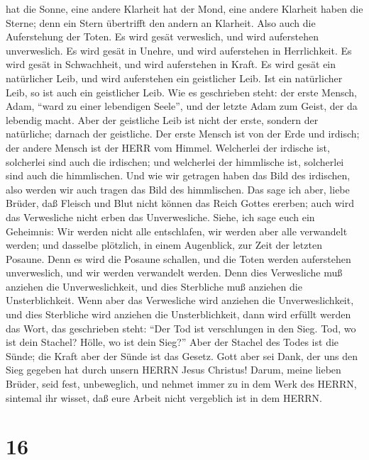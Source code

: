 hat die Sonne, eine andere Klarheit hat der Mond, eine andere Klarheit
haben die Sterne; denn ein Stern übertrifft den andern an Klarheit.
 Also auch die Auferstehung der Toten. Es wird gesät
verweslich, und wird auferstehen unverweslich.  Es wird
gesät in Unehre, und wird auferstehen in Herrlichkeit. Es wird gesät in
Schwachheit, und wird auferstehen in Kraft.  Es wird gesät
ein natürlicher Leib, und wird auferstehen ein geistlicher Leib. Ist ein
natürlicher Leib, so ist auch ein geistlicher Leib.  Wie es
geschrieben steht: der erste Mensch, Adam, ``ward zu einer lebendigen
Seele'', und der letzte Adam zum Geist, der da lebendig macht.
 Aber der geistliche Leib ist nicht der erste, sondern der
natürliche; darnach der geistliche.  Der erste Mensch ist
von der Erde und irdisch; der andere Mensch ist der HERR vom Himmel.
 Welcherlei der irdische ist, solcherlei sind auch die
irdischen; und welcherlei der himmlische ist, solcherlei sind auch die
himmlischen.  Und wie wir getragen haben das Bild des
irdischen, also werden wir auch tragen das Bild des himmlischen.
 Das sage ich aber, liebe Brüder, daß Fleisch und Blut
nicht können das Reich Gottes ererben; auch wird das Verwesliche nicht
erben das Unverwesliche.  Siehe, ich sage euch ein
Geheimnis: Wir werden nicht alle entschlafen, wir werden aber alle
verwandelt werden;  und dasselbe plötzlich, in einem
Augenblick, zur Zeit der letzten Posaune. Denn es wird die Posaune
schallen, und die Toten werden auferstehen unverweslich, und wir werden
verwandelt werden.  Denn dies Verwesliche muß anziehen die
Unverweslichkeit, und dies Sterbliche muß anziehen die Unsterblichkeit.
 Wenn aber das Verwesliche wird anziehen die
Unverweslichkeit, und dies Sterbliche wird anziehen die Unsterblichkeit,
dann wird erfüllt werden das Wort, das geschrieben steht: 
``Der Tod ist verschlungen in den Sieg. Tod, wo ist dein Stachel? Hölle,
wo ist dein Sieg?''  Aber der Stachel des Todes ist die
Sünde; die Kraft aber der Sünde ist das Gesetz.  Gott aber
sei Dank, der uns den Sieg gegeben hat durch unsern HERRN Jesus
Christus!  Darum, meine lieben Brüder, seid fest,
unbeweglich, und nehmet immer zu in dem Werk des HERRN, sintemal ihr
wisset, daß eure Arbeit nicht vergeblich ist in dem HERRN.

\hypertarget{section-15}{%
\section{16}\label{section-15}}

